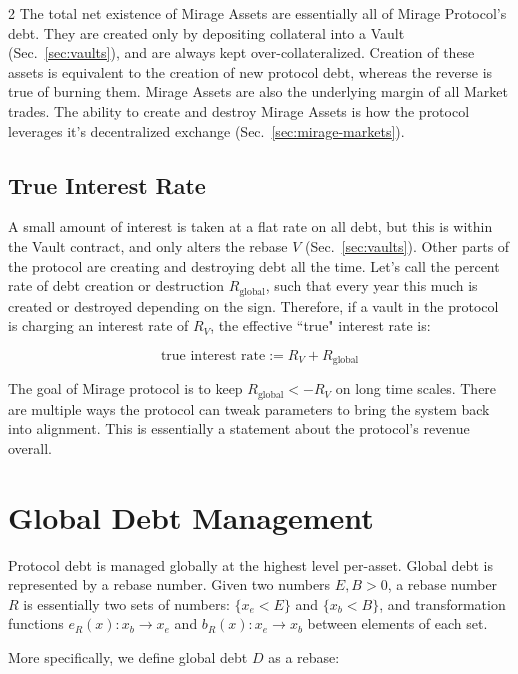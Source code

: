 \documentclass[letterpaper]{article}
\begin{document}
\begin{multicols}{2}
The total net existence of Mirage Assets are essentially all of Mirage Protocol's debt. They are created only by depositing collateral into a Vault (Sec.~\ref{sec:vaults}), and are always kept over-collateralized. Creation of these assets is equivalent to the creation of new protocol debt, whereas the reverse is true of burning them. Mirage Assets are also the underlying margin of all Market trades. The ability to create and destroy Mirage Assets is how the protocol leverages it's decentralized exchange (Sec.~\ref{sec:mirage-markets}). 


\subsection{True Interest Rate}

A small amount of interest is taken at a flat rate on all debt, but this is within the Vault contract, and only alters the rebase $V$ (Sec.~\ref{sec:vaults}). Other parts of the protocol are creating and destroying debt all the time. Let's call the percent rate of debt creation or destruction $R_{\text{global}}$, such that every year this much is created or destroyed depending on the sign. Therefore, if a vault in the protocol is charging an interest rate of $R_V$, the effective ``true" interest rate is:

\begin{equation}
    \text{true interest rate} := R_V + R_{\text{global}}
\end{equation}

The goal of Mirage protocol is to keep $R_{\text{global}} < -R_V$ on long time scales. There are multiple ways the protocol can tweak parameters to bring the system back into alignment. This is essentially a statement about the protocol's revenue overall.




\section{Global Debt Management}

Protocol debt is managed globally at the highest level per-asset. Global debt is represented by a rebase number. Given two numbers $E, B > 0$, a rebase number $R$ is essentially two sets of numbers: $\{x_e < E\}$ and $\{x_b < B\}$, and transformation functions $e_R(x): x_b \rightarrow x_e$ and $b_R(x): x_e \rightarrow x_b$ between elements of each set.

More specifically, we define global debt $D$ as a rebase:


\end{multicols}
\end{document}
